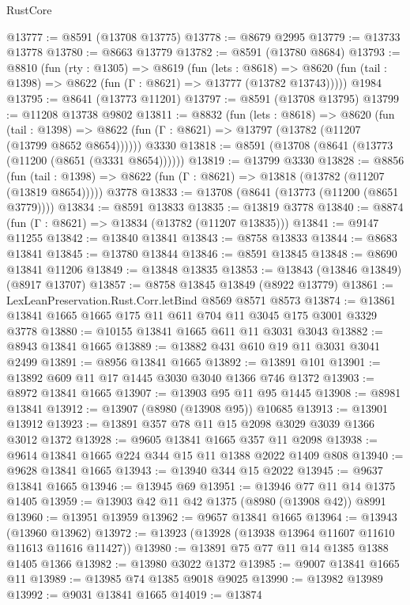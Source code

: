 \begin{lexlean}{RustCore}
\begin{coremodule}
@13777 := @8591 (@13708 @13775)
@13778 := @8679 @2995
@13779 := @13733 @13778
@13780 := @8663 @13779
@13782 := @8591 (@13780 @8684)
@13793 := @8810
    (fun (rty : @1305) =>
    @8619
      (fun (lets : @8618) =>
      @8620 (fun (tail : @1398) => @8622 (fun (Γ : @8621) => @13777 (@13782 @13743)))))
    @1984
@13795 := @8641 (@13773 @11201)
@13797 := @8591 (@13708 @13795)
@13799 := @11208 @13738 @9802
@13811 := @8832
    (fun (lets : @8618) =>
    @8620
      (fun (tail : @1398) =>
      @8622 (fun (Γ : @8621) => @13797 (@13782 (@11207 (@13799 @8652 @8654))))))
    @3330
@13818 := @8591 (@13708 (@8641 (@13773 (@11200 (@8651 (@3331 @8654))))))
@13819 := @13799 @3330
@13828 := @8856
    (fun (tail : @1398) => @8622 (fun (Γ : @8621) => @13818 (@13782 (@11207 (@13819 @8654)))))
    @3778
@13833 := @13708 (@8641 (@13773 (@11200 (@8651 @3779))))
@13834 := @8591 @13833
@13835 := @13819 @3778
@13840 := @8874 (fun (Γ : @8621) => @13834 (@13782 (@11207 @13835)))
@13841 := @9147 @11255
@13842 := @13840 @13841
@13843 := @8758 @13833
@13844 := @8683 @13841
@13845 := @13780 @13844
@13846 := @8591 @13845
@13848 := @8690 @13841 @11206
@13849 := @13848 @13835
@13853 := @13843 (@13846 @13849) (@8917 @13707)
@13857 := @8758 @13845 @13849 (@8922 @13779)
@13861 := LexLeanPreservation.Rust.Corr.letBind @8569 @8571 @8573
@13874 := @13861 @13841 @1665 @1665 @175 @11 @611 @704 @11 @3045 @175 @3001 @3329 @3778
@13880 := @10155 @13841 @1665 @611 @11 @3031 @3043
@13882 := @8943 @13841 @1665
@13889 := @13882 @431 @610 @19 @11 @3031 @3041 @2499
@13891 := @8956 @13841 @1665
@13892 := @13891 @101
@13901 := @13892 @609 @11 @17 @1445 @3030 @3040 @1366 @746 @1372
@13903 := @8972 @13841 @1665
@13907 := @13903 @95 @11 @95 @1445
@13908 := @8981 @13841
@13912 := @13907 (@8980 (@13908 @95)) @10685
@13913 := @13901 @13912
@13923 := @13891 @357 @78 @11 @15 @2098 @3029 @3039 @1366 @3012 @1372
@13928 := @9605 @13841 @1665 @357 @11 @2098
@13938 := @9614 @13841 @1665 @224 @344 @15 @11 @1388 @2022 @1409 @808
@13940 := @9628 @13841 @1665
@13943 := @13940 @344 @15 @2022
@13945 := @9637 @13841 @1665
@13946 := @13945 @69
@13951 := @13946 @77 @11 @14 @1375 @1405
@13959 := @13903 @42 @11 @42 @1375 (@8980 (@13908 @42)) @8991
@13960 := @13951 @13959
@13962 := @9657 @13841 @1665
@13964 := @13943 (@13960 @13962)
@13972 := @13923 (@13928 (@13938 @13964 @11607 @11610 @11613 @11616 @11427))
@13980 := @13891 @75 @77 @11 @14 @1385 @1388 @1405 @1366
@13982 := @13980 @3022 @1372
@13985 := @9007 @13841 @1665 @11
@13989 := @13985 @74 @1385 @9018 @9025
@13990 := @13982 @13989
@13992 := @9031 @13841 @1665
@14019 := @13874

\end{coremodule}
\end{lexlean}
